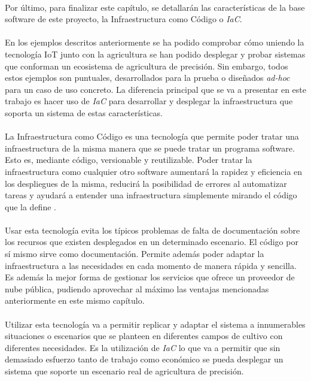 \documentclass[../../memoria.tex]{subfiles}
\begin{document}
\paragraph{}
Por último, para finalizar este capítulo, se detallarán las características de la base software de este proyecto, la Infraestructura como Código o \textit{IaC}.

\paragraph{}
En los ejemplos descritos anteriormente se ha podido comprobar cómo uniendo la tecnología IoT junto con la agricultura se han podido desplegar y probar sistemas que conforman un ecosistema de agricultura de precisión. Sin embargo, todos estos ejemplos son puntuales, desarrollados para la prueba o diseñados \textit{ad-hoc} para un caso de uso concreto. La diferencia principal que se va a presentar en este trabajo es hacer uso de \textit{IaC} para desarrollar y desplegar la infraestructura que soporta un sistema de estas características.

\paragraph{}
La Infraestructura como Código es una tecnología que permite poder tratar una infraestructura de la misma manera que se puede tratar un programa software. Esto es, mediante código, versionable y reutilizable. Poder tratar la infraestructura como cualquier otro software aumentará la rapidez y eficiencia en los despliegues de la misma, reducirá la posibilidad de errores al automatizar tareas y ayudará a entender una infraestructura simplemente mirando el código que la define \cite{iac}\cite{iac2}\cite{iac3}.

\paragraph{}
Usar esta tecnología evita los típicos problemas de falta de documentación sobre los recursos que existen desplegados en un determinado escenario. El código por sí mismo sirve como documentación. Permite además poder adaptar la infraestructura a las necesidades en cada momento de manera rápida y sencilla. Es además la mejor forma de gestionar los servicios que ofrece un proveedor de nube pública, pudiendo aprovechar al máximo las ventajas mencionadas anteriormente en este mismo capítulo.

\paragraph{}
Utilizar esta tecnología va a permitir replicar y adaptar el sistema a innumerables situaciones o escenarios que se planteen en diferentes campos de cultivo con diferentes necesidades. Es la utilización de \textit{IaC} lo que va a permitir que sin demasiado esfuerzo tanto de trabajo como económico se pueda desplegar un sistema que soporte un escenario real de agricultura de precisión.
\end{document}
